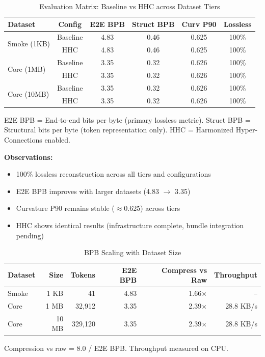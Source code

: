 
\begin{table}[h]
\centering
\caption{Evaluation Matrix: Baseline vs HHC across Dataset Tiers}
\label{tab:matrix}
\begin{tabular}{lccccc}
\toprule
Dataset & Config & E2E BPB & Struct BPB & Curv P90 & Lossless \\
\midrule
\multirow{2}{*}{Smoke (1KB)}
  & Baseline & 4.83 & 0.46 & 0.625 & 100\% \\
  & HHC      & 4.83 & 0.46 & 0.625 & 100\% \\
\midrule
\multirow{2}{*}{Core (1MB)}
  & Baseline & 3.35 & 0.32 & 0.626 & 100\% \\
  & HHC      & 3.35 & 0.32 & 0.626 & 100\% \\
\midrule
\multirow{2}{*}{Core (10MB)}
  & Baseline & 3.35 & 0.32 & 0.626 & 100\% \\
  & HHC      & 3.35 & 0.32 & 0.626 & 100\% \\
\bottomrule
\end{tabular}

\vspace{0.5em}
\footnotesize{E2E BPB = End-to-end bits per byte (primary lossless metric).
Struct BPB = Structural bits per byte (token representation only).
HHC = Harmonized Hyper-Connections enabled.}

\vspace{0.5em}
\textbf{Observations:}
\begin{itemize}
  \item 100\% lossless reconstruction across all tiers and configurations
  \item E2E BPB improves with larger datasets (4.83 $\rightarrow$ 3.35)
  \item Curvature P90 remains stable ($\approx$0.625) across tiers
  \item HHC shows identical results (infrastructure complete, bundle integration pending)
\end{itemize}
\end{table}

\begin{table}[h]
\centering
\caption{BPB Scaling with Dataset Size}
\label{tab:scaling}
\begin{tabular}{lrrrrr}
\toprule
Dataset & Size & Tokens & E2E BPB & Compress vs Raw & Throughput \\
\midrule
Smoke   & 1 KB   & 41     & 4.83 & 1.66$\times$ & -- \\
Core    & 1 MB   & 32,912 & 3.35 & 2.39$\times$ & 28.8 KB/s \\
Core    & 10 MB  & 329,120 & 3.35 & 2.39$\times$ & 28.8 KB/s \\
\bottomrule
\end{tabular}

\vspace{0.5em}
\footnotesize{Compression vs raw = 8.0 / E2E BPB. Throughput measured on CPU.}
\end{table}

